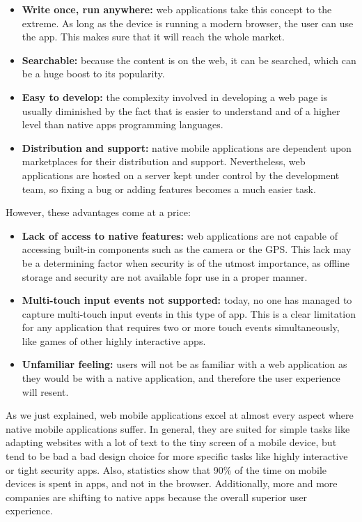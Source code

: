 \begin{itemize}
	\item \textbf{Write once, run anywhere:} web applications take this concept to the extreme. As long as the device is running a modern browser, the user can use the app. This makes sure that it will reach the whole market. 
	\item \textbf{Searchable:} because the content is on the web, it can be searched, which can be a huge boost to its popularity.
	\item \textbf{Easy to develop:} the complexity involved in developing a web page is usually diminished by the fact that is easier to understand and of a higher level than native apps programming languages.
	\item \textbf{Distribution and support:} native mobile applications are dependent upon marketplaces for their distribution and support. Nevertheless, web applications are hosted on a server kept under control by the development team, so fixing a bug or adding features becomes a much easier task.
\end{itemize}

However, these advantages come at a price:

\begin{itemize}
	\item \textbf{Lack of access to native features:} web applications are not capable of accessing built-in components such as the camera or the GPS. This lack may be a determining factor when security is of the utmost importance, as offline storage and security are not available fopr use in a proper manner.
	\item \textbf{Multi-touch input events not supported:} today, no one has managed to capture multi-touch input events in this type of app. This is a clear limitation for any application that requires two or more touch events simultaneously, like games of other highly interactive apps.
	\item \textbf{Unfamiliar feeling:} users will not be as familiar with a web application as they would be with a native application, and therefore the user experience will resent.
\end{itemize}

As we just explained, web mobile applications excel at almost every aspect where native mobile applications suffer. In general, they are suited for simple tasks like adapting websites with a lot of text to the tiny screen of a mobile device, but tend to be bad a bad design choice for more specific tasks like highly interactive or tight security apps. Also, statistics show that 90\% of the time on mobile devices is spent in apps, and not in the browser. Additionally, more and more companies are shifting to native apps because the overall superior user experience.

